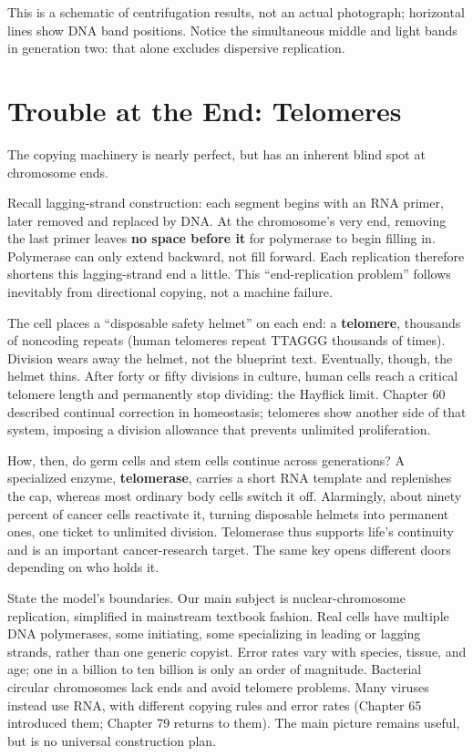 This is a schematic of centrifugation results, not an actual photograph; horizontal lines show DNA band positions. Notice the simultaneous middle and light bands in generation two: that alone excludes dispersive replication.

\section{Trouble at the End: Telomeres}

The copying machinery is nearly perfect, but has an inherent blind spot at chromosome ends.

Recall lagging-strand construction: each segment begins with an RNA primer, later removed and replaced by DNA. At the chromosome's very end, removing the last primer leaves \textbf{no space before it} for polymerase to begin filling in. Polymerase can only extend backward, not fill forward. Each replication therefore shortens this lagging-strand end a little. This ``end-replication problem'' follows inevitably from directional copying, not a machine failure.

The cell places a ``disposable safety helmet'' on each end: a \textbf{telomere}, thousands of noncoding repeats (human telomeres repeat TTAGGG thousands of times). Division wears away the helmet, not the blueprint text. Eventually, though, the helmet thins. After forty or fifty divisions in culture, human cells reach a critical telomere length and permanently stop dividing: the Hayflick limit. Chapter 60 described continual correction in homeostasis; telomeres show another side of that system, imposing a division allowance that prevents unlimited proliferation.

How, then, do germ cells and stem cells continue across generations? A specialized enzyme, \textbf{telomerase}, carries a short RNA template and replenishes the cap, whereas most ordinary body cells switch it off. Alarmingly, about ninety percent of cancer cells reactivate it, turning disposable helmets into permanent ones, one ticket to unlimited division. Telomerase thus supports life's continuity and is an important cancer-research target. The same key opens different doors depending on who holds it.

State the model's boundaries. Our main subject is nuclear-chromosome replication, simplified in mainstream textbook fashion. Real cells have multiple DNA polymerases, some initiating, some specializing in leading or lagging strands, rather than one generic copyist. Error rates vary with species, tissue, and age; one in a billion to ten billion is only an order of magnitude. Bacterial circular chromosomes lack ends and avoid telomere problems. Many viruses instead use RNA, with different copying rules and error rates (Chapter 65 introduced them; Chapter 79 returns to them). The main picture remains useful, but is no universal construction plan.

